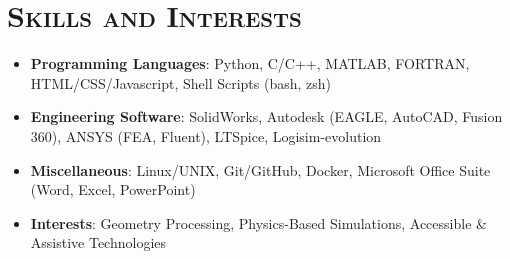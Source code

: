\documentclass[letterpaper, 10pt]{article}
\newcommand{\vspa}{\vspace{0.1cm}}
\begin{document}
	
	\vspa
	
	\section*{\faCog \quad \textsc{Skills and Interests}}
	\begin{itemize}[leftmargin=*]
		\item \textbf{Programming Languages}: Python, C/C++, MATLAB, FORTRAN, HTML/CSS/Javascript, Shell Scripts (bash, zsh)
		\item \textbf{Engineering Software}: SolidWorks, Autodesk (EAGLE, AutoCAD, Fusion 360), ANSYS (FEA, Fluent), LTSpice, Logisim-evolution
		\item \textbf{Miscellaneous}: Linux/UNIX, Git/GitHub, Docker, Microsoft Office Suite (Word, Excel, PowerPoint)
		\item \textbf{Interests}: Geometry Processing, Physics-Based Simulations, Accessible \& Assistive Technologies
	\end{itemize}
\end{document}
